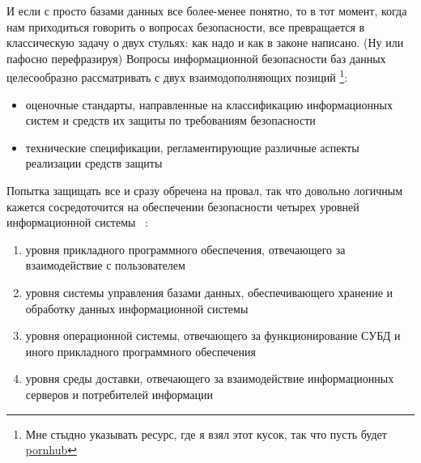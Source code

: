 
И если с просто базами данных все более-менее понятно, то в тот момент, когда нам приходиться говорить о вопросах безопасности, все превращается в классическую задачу о двух стульях: как надо и как в законе написано. (Ну или пафосно перефразируя) Вопросы информационной безопасности баз данных целесообразно рассматривать с двух взаимодополняющих позиций \autocite{Lihonosov2011}\footnote{Мне стыдно указывать ресурс, где я взял этот кусок, так что пусть будет \href{http://www.e-biblio.ru/book/bib/01_informatika/b_baz_dan/sg.html\#_Toc327430692}{pornhub}}:
\begin{itemize}
	\item оценочные стандарты, направленные на классификацию информационных систем и средств их защиты по требованиям безопасности
	\item технические спецификации, регламентирующие различные аспекты реализации средств защиты
\end{itemize} 

Попытка защищать все и сразу обречена на провал, так что довольно логичным кажется сосредоточится на обеспечении безопасности четырех уровней информационной системы \autocite{Lihonosov2011}~\label{pon:urov}:
\begin{enumerate}
	\item уровня прикладного программного обеспечения, отвечающего за взаимодействие с пользователем
	\item уровня системы управления базами данных, обеспечивающего хранение и обработку данных информационной системы
	\item уровня операционной системы, отвечающего за функционирование СУБД и иного прикладного программного обеспечения
	\item уровня среды доставки, отвечающего за взаимодействие информационных серверов и потребителей информации
\end{enumerate}

